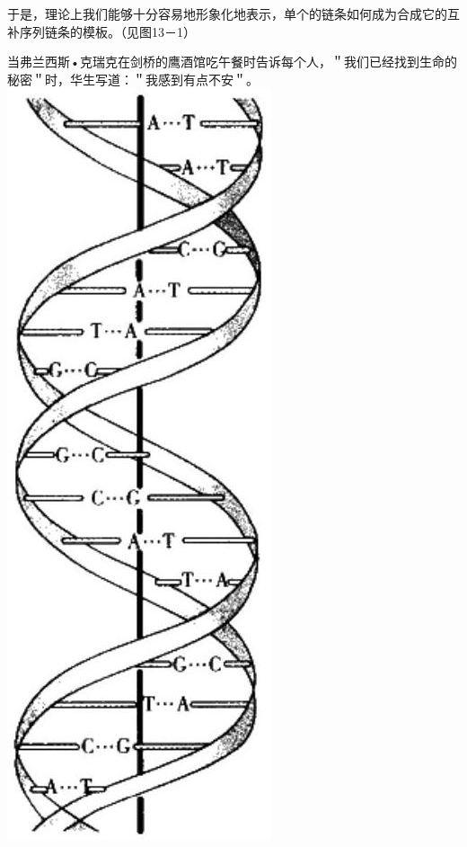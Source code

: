 于是，理论上我们能够十分容易地形象化地表示，单个的链条如何成为合成它的互补序列链条的模板。\cite{watson1968e}（见图13－1）

当弗兰西斯•克瑞克在剑桥的鹰酒馆吃午餐时告诉每个人，＂我们已经找到生命的秘密＂时，华生写道：＂我感到有点不安＂\cite{watson1968f}。\\
\includegraphics[width=\textwidth]{images/2025_05_15_6a28331d5e7c993ad07ag-590.jpg}

